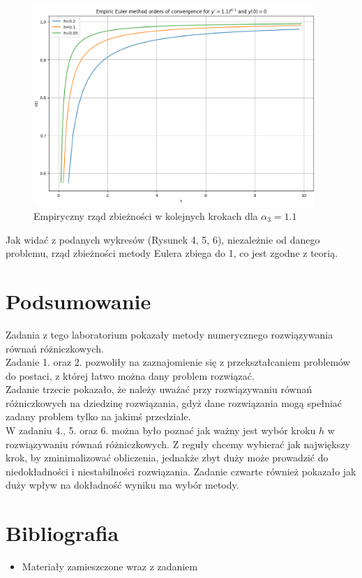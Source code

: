 \documentclass{article}
\begin{document}
\begin{figure}[H]
    \centering
    \includegraphics[width=0.95\textwidth]{6}
    \caption{Empiryczny rząd zbieżności w kolejnych krokach dla $\alpha_3 = 1.1$}
    \label{fig:mesh}
\end{figure}
Jak widać z podanych wykresów (Rysunek 4, 5, 6), niezależnie od danego problemu, rząd zbieżności metody Eulera zbiega do 1, co jest zgodne z teorią.

\section{Podsumowanie}
Zadania z tego laboratorium pokazały metody numerycznego rozwiązywania równań różniczkowych.
\\
Zadanie 1. oraz 2. pozwoliły na zaznajomienie się z przekształcaniem problemów do postaci, z której łatwo można dany problem rozwiązać.
\\
Zadanie trzecie pokazało, że należy uważać przy rozwiązywaniu równań różniczkowych na dziedzinę rozwiązania, gdyż dane rozwiązania mogą spełniać zadany problem tylko na jakimś przedziale.
\\
W zadaniu 4., 5. oraz 6. można było poznać jak ważny jest wybór kroku $h$ w rozwiązywaniu równań różniczkowych. Z reguły chcemy wybierać jak największy krok, by zminimalizować obliczenia, jednakże zbyt duży może prowadzić do niedokładności i niestabilności rozwiązania. Zadanie czwarte również pokazało jak duży wpływ na dokładność wyniku ma wybór metody.

\section{Bibliografia}
\begin{itemize}
\item Materiały zamieszczone wraz z zadaniem
\end{itemize}
\end{document}
